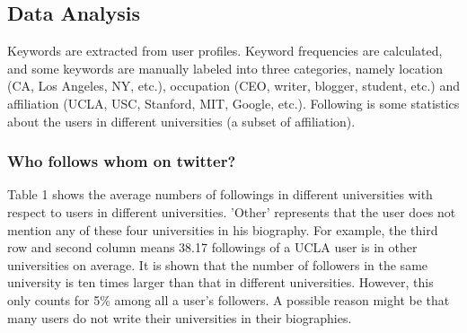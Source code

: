 \subsection{Data Analysis}
Keywords are extracted from user profiles. Keyword frequencies are calculated, and some keywords are manually labeled into three categories, namely location (CA, Los Angeles, NY, etc.), occupation (CEO, writer, blogger, student, etc.) and affiliation (UCLA, USC, Stanford, MIT, Google, etc.). Following is some statistics about the users in different universities (a subset of affiliation).

\subsubsection{Who follows whom on twitter?}
Table 1 shows the average numbers of followings in different universities with respect to users in different universities. 'Other' represents that the user does not mention any of these four universities in his biography. For example, the third row and second column means 38.17 followings of a UCLA user is in other universities on average. It is shown that the number of followers in the same university is ten times larger than that in different universities. However, this only counts for 5\% among all a user's followers. A possible reason might be that many users do not write their universities in their biographies.


